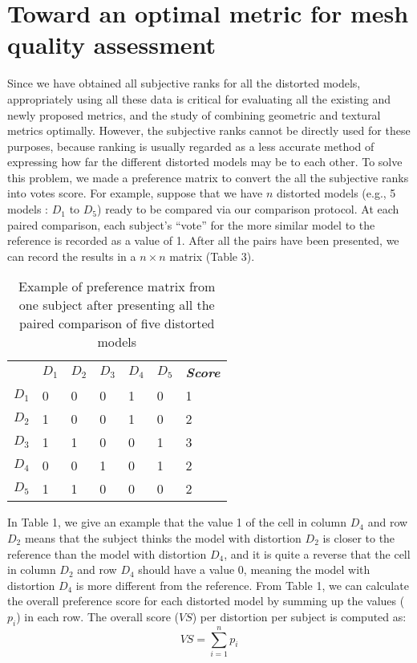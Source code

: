 \section{Toward an optimal metric for mesh quality assessment}
Since we have obtained all subjective ranks for all the distorted models, appropriately using all these data is critical for evaluating all the existing and newly proposed metrics, and the study of combining geometric and textural metrics optimally. However, the subjective ranks cannot be directly used for these purposes, because ranking is usually regarded as a less accurate method of expressing how far the different distorted models may be to each other.  To solve this problem, we made a preference matrix \cite{Ledda_2005} to convert the all the subjective ranks into votes score. For example, suppose that we have $n$ distorted models (e.g., 5 models : $D_1$ to $D_5$) ready to be compared via our comparison protocol.   At each paired comparison, each subject’s “vote” for the more similar model to the reference is recorded as a value of 1. After all the pairs have been presented, we can record the results in a $n \times n$ matrix (Table 3).
\begin{table}[]
\centering
\caption{Example of preference matrix from one subject after presenting all the paired comparison of five distorted models}
\label{my-label}
\begin{tabular}{lllllll}
            & $D_1$ & $D_2$ & $D_3$ & $D_4$ & $D_5$ & \textit{\textbf{Score}} \\
$D_1$ & 0           & 0           & 0           & 1           & 0           & 1     \\
$D_2$ & 1           & 0           & 0           & 1           & 0           & 2     \\
$D_3$ & 1           & 1           & 0           & 0           & 1           & 3     \\
$D_4$ & 0           & 0           & 1           & 0           & 1           & 2     \\
$D_5$ & 1           & 1           & 0           & 0           & 0           & 2    
\end{tabular}
\end{table}
In Table 1, we give an example that the value 1 of the cell in column $D_4$ and row $D_2$ means that the subject thinks the model with distortion $D_2$ is closer to the reference than the model with distortion $D_4$, and it is quite a reverse that the cell in column $D_2$ and row $D_4$ should have a value 0, meaning the model with distortion $D_4$ is more different from the reference. From Table 1, we can calculate the overall preference score for each distorted model by summing up the values ($p_i$) in each row. The overall score ($VS$) per distortion per subject is computed as:
\begin{equation}
VS =\sum_{i=1}^n{p_i}
\end{equation}